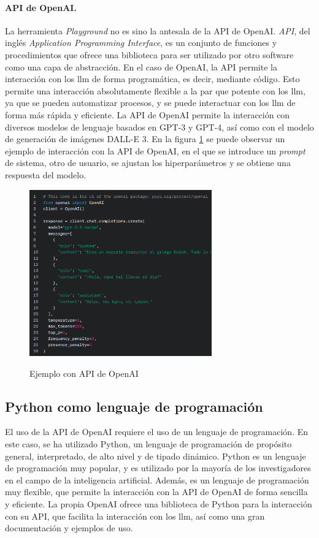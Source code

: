     \paragraph{API de OpenAI.} La herramienta \emph{Playground} no es sino la antesala de la API de OpenAI. \emph{API}, del inglés \emph{Application Programming Interface}, es un conjunto de funciones y procedimientos que ofrece una biblioteca para ser utilizado por otro software como una capa de abstracción. En el caso de OpenAI, la API permite la interacción con los \gls{llm} de forma programática, es decir, mediante código. Esto permite una interacción absolutamente flexible a la par que potente con los \gls{llm}, ya que se pueden automatizar procesos, y se puede interactuar con los \gls{llm} de forma más rápida y eficiente. La API de OpenAI permite la interacción con diversos modelos de lenguaje basados en GPT-3 y GPT-4, así como con el modelo de generación de imágenes DALL-E 3. En la figura \ref{fig:api} se puede observar un ejemplo de interacción con la API de OpenAI, en el que se introduce un \emph{prompt} de sistema, otro de usuario, se ajustan los hiperparámetros y se obtiene una respuesta del modelo.

    \begin{figure}[h]
        \caption[Ejemplo con API de OpenAI]{Ejemplo con API de OpenAI}
        \centering
        \includegraphics[width=0.7\textwidth]{./figuras/ejemplo_API.png}
        \source{\propio}
        \label{fig:api}
    \end{figure}

\subsection{Python como lenguaje de programación}
El uso de la API de OpenAI requiere el uso de un lenguaje de programación. En este caso, se ha utilizado Python, un lenguaje de programación de propósito general, interpretado, de alto nivel y de tipado dinámico. Python es un lenguaje de programación muy popular, y es utilizado por la mayoría de los investigadores en el campo de la inteligencia artificial. Además, es un lenguaje de programación muy flexible, que permite la interacción con la API de OpenAI de forma sencilla y eficiente. La propia OpenAI ofrece una biblioteca de Python para la interacción con su API, que facilita la interacción con los \gls{llm}, así como una gran documentación y ejemplos de uso. 

